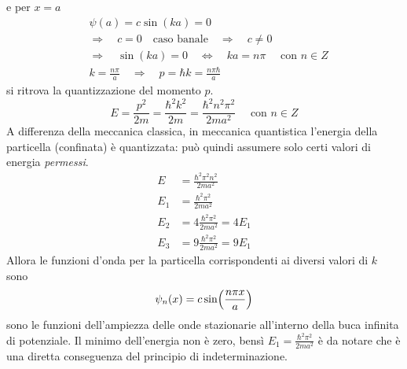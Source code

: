 e per $x=a$
\begin{equation}
\begin{split}
& \psi(a) = c \sin(k a) = 0 \\
& \Rightarrow\quad c = 0 \quad \mbox{caso banale} \quad\Rightarrow\quad c\not= 0 \\
& \Rightarrow\quad \sin(k a) = 0 \quad\Leftrightarrow\quad ka = n \pi \quad \mbox{ con } n \in Z \\
& k = \frac{ n\pi}{a } \quad\Rightarrow\quad  p = \hbar k = \frac{ n \pi \hbar}{a }
\end{split}
\end{equation}
si ritrova la quantizzazione del momento $p$.
\begin{equation}
E = \frac{p^2}{2m} = \frac{\hbar^2 k^2}{2m} = \frac{\hbar^2 n^2 \pi^2 }{2 m a^2} \quad \mbox{ con } n \in Z
\end{equation}
A differenza della meccanica classica, in meccanica quantistica l'energia della particella (confinata) è quantizzata: può quindi assumere solo certi valori di energia \textit{permessi}.
\begin{equation}
\begin{split}
E & = \frac{ \hbar^2 \pi^2 n^2}{2ma^2 } \\
E_1 & = \frac{ \hbar^2 \pi^2}{2ma^2 } \\
E_2 & = 4 \frac{ \hbar^2 \pi^2}{2ma^2 } = 4 E_1 \\
E_3 & = 9 \frac{ \hbar^2 \pi^2}{2ma^2 } = 9 E_1
\end{split}
\end{equation}
Allora le funzioni d'onda per la particella corrispondenti ai diversi valori di $k$ sono
\begin{equation}
\psi_n(x) = c \sin\Bigl(  \frac{ n\pi x}{a }  \Bigr)
\end{equation}
sono le funzioni dell'ampiezza delle onde stazionarie all'interno della buca infinita di potenziale.
Il minimo dell'energia non è zero, bensì $E_1 = \frac{ \hbar^2 \pi^2}{2ma^2}$
è da notare che è una diretta conseguenza del principio di indeterminazione. 


